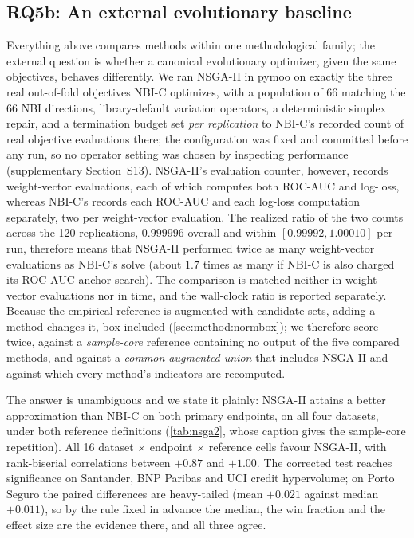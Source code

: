 \subsection{RQ5b: An external evolutionary baseline}
\label{sec:results:nsga2}

Everything above compares methods within one methodological family; the external question is whether a canonical
evolutionary optimizer, given the same objectives, behaves differently. We ran NSGA-II \citep{deb2002nsga2}
in pymoo \citep{blank2020pymoo} on exactly the three real out-of-fold objectives NBI-C optimizes, with a population of
66 matching the 66 NBI directions, library-default variation operators, a deterministic simplex repair, and a
termination budget set \emph{per replication} to NBI-C's recorded count of real objective evaluations there; the
configuration was fixed and committed before any run, so no operator setting was chosen by inspecting performance
(supplementary Section~S13). NSGA-II's evaluation counter, however, records weight-vector evaluations, each of which
computes both ROC-AUC and log-loss, whereas NBI-C's records each ROC-AUC and each log-loss computation separately, two
per weight-vector evaluation. The realized ratio of the two counts across the 120 replications, $0.999996$ overall and
within $[0.99992, 1.00010]$ per run, therefore means that NSGA-II performed twice as many weight-vector evaluations as
NBI-C's solve (about $1.7$ times as many if NBI-C is also charged its ROC-AUC anchor search). The comparison is matched
neither in weight-vector evaluations nor in time, and the wall-clock ratio is reported separately. Because the
empirical reference is augmented with candidate sets, adding a method changes it, box included
(\cref{sec:method:normbox}); we therefore score twice, against a \emph{sample-core} reference containing no output of
the five compared methods, and against a \emph{common augmented union} that includes NSGA-II and against which every
method's indicators are recomputed.



The answer is unambiguous and we state it plainly: NSGA-II attains a better approximation than NBI-C on both
primary endpoints, on all four datasets, under both reference definitions (\cref{tab:nsga2}, whose caption gives the
sample-core repetition). All 16 dataset $\times$ endpoint $\times$ reference cells favour NSGA-II, with
rank-biserial correlations between $+0.87$ and $+1.00$. The corrected test reaches significance on Santander, BNP
Paribas and UCI credit hypervolume; on Porto Seguro the paired differences are heavy-tailed (mean $+0.021$ against
median $+0.011$), so by the rule fixed in advance the median, the win fraction and the effect size are the evidence
there, and all three agree.

